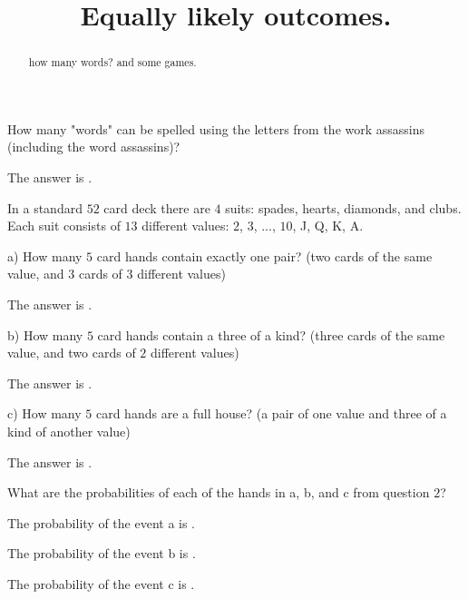 \documentclass{ximera}
\title{Equally likely outcomes.}
\begin{document}
\begin{abstract}
how many words? and some games.
\end{abstract}
\maketitle

\begin{question}
How many "words" can be spelled using the letters from the work assassins (including the word assassins)?
     \begin{solution}
           The answer is .
     \end{solution}
\end{question}

In a standard $52$ card deck there are $4$ suits:  spades, hearts, diamonds, and clubs.  Each suit consists of $13$ different values:  $2$, $3$, ..., $10$, J, Q, K, A. 

\begin{question}
a)  How many $5$ card hands contain exactly one pair?  (two cards of the same value, and $3$ cards of $3$ different values)
     \begin{solution}
           The answer is .
     \end{solution}
\end{question}     

\begin{question}     
b)  How many $5$ card hands contain a three of a kind?  (three cards of the same value, and two cards of $2$ different values)
     \begin{solution}
           The answer is .
     \end{solution}
\end{question}     

\begin{question}     
c)  How many $5$ card hands are a full house?  (a pair of one value and three of a kind of another value)
     \begin{solution}
           The answer is .
     \end{solution}
\end{question}

\begin{question}
What are the probabilities of each of the hands in a, b, and c from question $2$?
     \begin{solution}
           The probability of the event a is .
     \end{solution}
      \begin{solution}
           The probability of the event b is .
     \end{solution}
      \begin{solution}
           The probability of the event c is .
     \end{solution}
\end{question}
\end{document}
